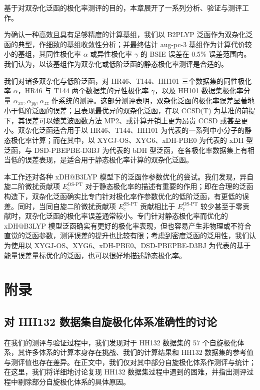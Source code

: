 基于对双杂化泛函的极化率测评的目的，本章展开了一系列分析、验证与测评工作。

为确认一种高效且具有足够精度的计算基组，我们以 B2PLYP 泛函作为双杂化泛函的典型，作细致的基组收敛性分析；并最终估计 aug-pc-3 基组作为计算代价较小的基组，其同性极化率 $\alpha$ 或异性极化率 $\gamma$ 的 BSIE 误差在 0.5\% 误差范围内。我们认为，以该基组作为双杂化或低阶泛函的静态极化率测评是合适的。

我们对诸多双杂化与低阶泛函，对 HR46、T144、HH101 三个数据集的同性极化率 $\alpha$，HR46 与 T144 两个数据集的异性极化率 $\gamma$，以及 HH101 数据集极化率分量 $\alpha_{xx}, \alpha_{yy}, \alpha_{zz}$ 作系统的测评。这部分测评表明，双杂化泛函的极化率误差显著地小于低阶泛函的误差；且表现最优异的双杂化泛函，在以 CCSD(T) 为基准的前提下，其误差可以媲美波函数方法 MP2、或计算开销上更为昂贵 CCSD 或甚至更小。双杂化泛函适合用于以 HR46、T144、HH101 为代表的一系列中小分子的静态极化率计算；而在其中，以 XYGJ-OS、XYG6、xDH-PBE0 为代表的 xDH 型泛函，与 DSD-PBEPBE-D3BJ 为代表的 bDH 型泛函，在各极化率数据集上有相当低的误差表现，是适合用于静态极化率计算的双杂化泛函。

本工作还对各种 xDH@B3LYP 模型下的泛函作参数优化的尝试。我们发现，异自旋二阶微扰贡献项 $E_\mathrm{c}^\text{OS-PT}$ 对于静态极化率的描述有重要的作用；即在合理的泛函构造下，双杂化泛函确实比专门针对极化率作参数优化的低阶泛函，有更低的误差。同时，当同自旋二阶微扰贡献项 $E_\mathrm{c}^\text{SS-PT}$ 贡献相比于 $E_\mathrm{c}^\text{OS-PT}$ 较少甚至于零贡献时，双杂化泛函的极化率误差通常较小。专门针对静态极化率而优化的 xDH@B3LYP 模型泛函确实有更好的极化率表现，但也容易产生非物理或不符合直觉的泛函参数，测评误差的提升也比较有限；考虑到密度泛函的泛用性，我们认为使用以 XYGJ-OS、XYG6、xDH-PBE0、DSD-PBEPBE-D3BJ 为代表的基于能量误差量标优化的泛函，也可以很好地描述静态极化率。

\newpage

\section{附录}

\subsection{对 HH132 数据集自旋极化体系准确性的讨论}
\label{sec.6.supp-HH132-remove}

在我们的测评与验证过程中，我们发现对于 HH132 数据集\cite{Hait-Head-Gordon.PCCP.2018}的 57 个自旋极化体系，其许多体系的计算本身存在挑战、我们的计算结果和 HH132 数据集的参考值与测评值也存在差异。在正文中，我们仅对其中部分自旋极化体系作测评与统计；在这里，我们将详细地讨论复现 HH132 数据集过程中遇到的困难，并指出测评过程中剔除部分自旋极化体系的具体原因。

